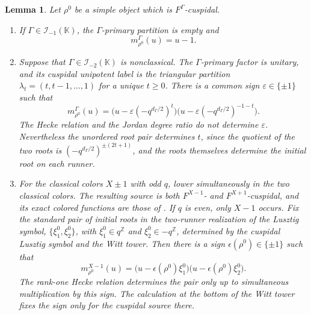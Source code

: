 \documentclass[12pt]{amsart}
\numberwithin{itemcounter}{subsection}
\theoremstyle{plain}
\newtheorem{lemma}[theorem]{Lemma}
\theoremstyle{definition}
\theoremstyle{remark}
\numberwithin{equation}{section}
\def\bbK{\mathbb{K}}
\def\calI{\mathcal{I}}
\begin{document}
\begin{lemma}\label{lem:Fgamma-cuspidal-seeds}
Let \(\rho^0\) be a simple object which is \(F^\Gamma\)-cuspidal.
\begin{enumerate}
\item If \(\Gamma\in\calI_{-1}(\bbK)\), the \(\Gamma\)-primary partition is
empty and
\[
 m_{\rho^0}^\Gamma(u)=u-1.
\]
\item Suppose that \(\Gamma\in\calI_{-2}(\bbK)\) is nonclassical.  The \(\Gamma\)-primary factor is unitary, and its
cuspidal unipotent label is the triangular partition
\(\lambda_t=(t,t-1,\ldots,1)\) for a unique \(t\ge0\).  There is a common
sign \(\varepsilon\in\{\pm1\}\) such that
\[
 m_{\rho^0}^\Gamma(u)
 =\bigl(u-\varepsilon(-q^{d_\Gamma/2})^t\bigr)
  \bigl(u-\varepsilon(-q^{d_\Gamma/2})^{-1-t}\bigr).
\]
The Hecke relation and the Jordan degree ratio do not determine
\(\varepsilon\).  Nevertheless the unordered root pair determines \(t\),
since the quotient of the two roots is
\((-q^{d_\Gamma/2})^{\pm(2t+1)}\), and the roots themselves determine the initial root on each runner.
\item For the classical colors \(X\pm1\) with odd \(q\), lower
simultaneously in the two classical colors.  The resulting source is both
\(F^{X-1}\)- and \(F^{X+1}\)-cuspidal, and its exact colored functions are
those of \cite[Theorem~5.13 and Table~4]{LSZ25}.  If \(q\) is even, only
\(X-1\) occurs.  Fix the standard pair of initial roots in the two-runner realization of the Lusztig symbol, \(\{\xi^0_1,\xi^0_2\}\), with
\(\xi^0_1\in q^{\mathbb Z}\) and
\(\xi^0_2\in-q^{\mathbb Z}\), determined by the cuspidal Lusztig symbol and the Witt tower.  Then there is a sign \(\epsilon(\rho^0)\in\{\pm1\}\) such that
\[
 m_{\rho^0}^{X-1}(u)
 =\bigl(u-\epsilon(\rho^0)\xi^0_1\bigr)
  \bigl(u-\epsilon(\rho^0)\xi^0_2\bigr).
\]
The rank-one Hecke relation determines the pair only up to simultaneous multiplication by this sign.  The calculation at the bottom of the Witt tower fixes the sign only for the cuspidal source there.
\end{enumerate}
\end{lemma}
\end{document}

